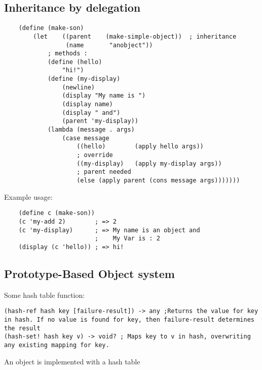 \subsection{Inheritance by delegation}
\begin{lstlisting}
    (define (make-son)
        (let    ((parent    (make-simple-object))  ; inheritance
                 (name       "anobject"))          
            ; methods :
            (define (hello)
                "hi!")
            (define (my-display)
                (newline)
                (display "My name is ")
                (display name)
                (display " and")
                (parent 'my-display))
            (lambda (message . args)
                (case message
                    ((hello)        (apply hello args))
                    ; override
                    ((my-display)   (apply my-display args))
                    ; parent needed
                    (else (apply parent (cons message args)))))))
\end{lstlisting}
Example usage:
\begin{lstlisting}
    (define c (make-son))
    (c 'my-add 2)        ; => 2
    (c 'my-display)      ; => My name is an object and
                         ;    My Var is : 2
    (display (c 'hello)) ; => hi!
\end{lstlisting}

\subsection{Prototype-Based Object system}
Some hash table function:
\begin{lstlisting}
(hash-ref hash key [failure-result]) -> any ;Returns the value for key in hash. If no value is found for key, then failure-result determines the result
(hash-set! hash key v) -> void? ; Maps key to v in hash, overwriting any existing mapping for key.
\end{lstlisting}

An object is implemented with a hash table

